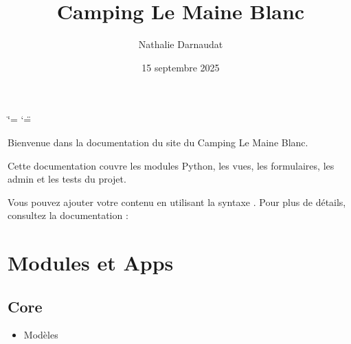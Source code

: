 \documentclass[letterpaper,10pt,french]{sphinxmanual}
\title{Camping Le Maine Blanc}
\date{15 septembre 2025}
\author{Nathalie Darnaudat}
\begin{document}
\ifdefined\shorthandoff
  \ifnum\catcode`\=\string=\active\shorthandoff{=}\fi
  \ifnum\catcode`\"=\active{}\fi
\fi

\pagestyle{empty}
\sphinxmaketitle
\pagestyle{plain}
\sphinxtableofcontents
\pagestyle{normal}
\label{\detokenize{index::doc}}


\sphinxAtStartPar
Bienvenue dans la documentation du site du Camping Le Maine Blanc.

\sphinxAtStartPar
Cette documentation couvre les modules Python, les vues, les formulaires, les admin et les tests du projet.

\sphinxAtStartPar
Vous pouvez ajouter votre contenu en utilisant la syntaxe .
Pour plus de détails, consultez la documentation :


\chapter{Modules et Apps}
\label{\detokenize{index:modules-et-apps}}

\section{Core}
\label{\detokenize{index:core}}\begin{itemize}
\item {} 
\sphinxAtStartPar
Modèles

\end{itemize}
\label{\detokenize{index:module-core.models}}
\end{document}
